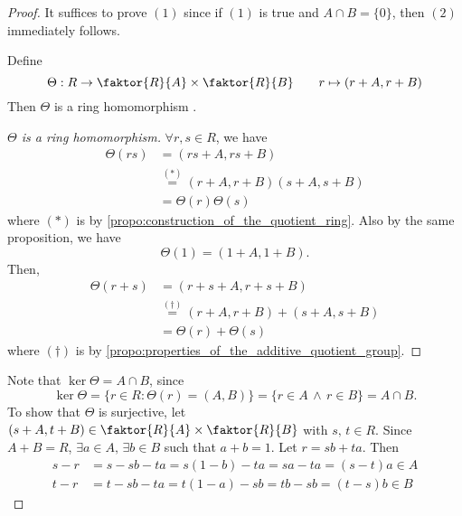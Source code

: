 \begin{proof}
  It suffices to prove $(1)$ since if $(1)$ is true and $A \cap B = \{0\}$, then $(2)$ immediately follows.

  Define
  \begin{equation*}
    \Theta: R \to \faktor{R}{A} \times \faktor{R}{B} \qquad r \mapsto ( r + A, r + B )
  \end{equation*}
  Then $\Theta$ is a ring homomorphism .

  \begin{proof}[$\Theta$ is a ring homomorphism]
    $\forall r, s \in R$, we have
    \begin{align*}
      \Theta(rs) &= (rs + A, rs + B) \\
                 &\overset{(*)}{=} (r + A, r + B)(s + A, s + B) \\
                 &= \Theta(r) \Theta(s)
    \end{align*}
    where $(*)$ is by \cref{propo:construction_of_the_quotient_ring}. Also by the same proposition, we have
    \begin{equation*}
      \Theta(1) = (1 + A, 1 + B).
    \end{equation*}
    Then,
    \begin{align*}
      \Theta(r + s) &= (r + s + A, r + s + B) \\
                    &\overset{(\dagger)}{=} (r + A, r + B) + (s + A, s + B) \\
                    &= \Theta(r) + \Theta(s)
    \end{align*}
    where $(\dagger)$ is by \cref{propo:properties_of_the_additive_quotient_group}.
  \end{proof}
  Note that $\ker \Theta = A \cap B$, since
  \begin{equation*}
    \ker \Theta = \{ r \in R : \Theta(r) = (A, B) \} = \{r \in A \, \land \, r \in B \} = A \cap B.
  \end{equation*}
  To show that $\Theta$ is surjective, let $(s + A, t + B) \in \faktor{R}{A} \times \faktor{R}{B}$ with $s, \, t \in R$. Since $A + B = R$, $\exists a \in A, \, \exists b \in B$ such that $a + b = 1$. Let $r = sb + ta$. Then
  \begin{align*}
    s - r &= s - sb - ta = s(1 - b) - ta = sa - ta = (s - t) a \in A \\
    t - r &= t - sb - ta = t(1 - a) - sb = tb - sb = (t - s) b \in B

\end{align*}
\end{proof}
